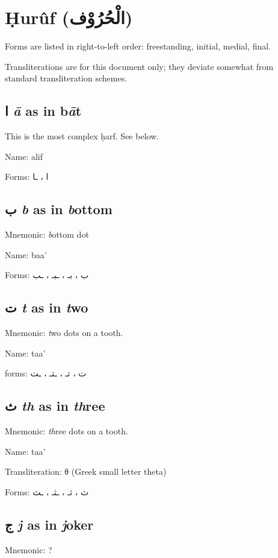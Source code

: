 \documentclass[11pt]{article}
\begin{document}
\section{Ḥurûf (\textarabic{الْحُرُوْف})}

Forms are listed in right-to-left order: freestanding, initial,
medial, final.

Transliterations are for this document only; they deviate somewhat
from standard transliteration schemes.

\subsection{ \textarabic{ا}  \textit{ā} as in b\textit{ā}t}
This is the most complex ḥarf. See below.

\noindent Name: alif

\noindent Forms: \textarabic{ا ، ـا}


\subsection{ \textarabic{ب}  \textit{b} as in \textit{b}ottom}
Mnemonic: \textit{b}ottom dot

\noindent Name: baa'

\noindent Forms: \textarabic{ب ، بـ ، ـبـ ، ـب}


\subsection{ \textarabic{ت} \textit{t} as in \textit{t}wo}
Mnemonic: \textit{t}wo dots on a tooth.

\noindent Name: taa'

\noindent forms: \textarabic{ت ، تـ ، ـتـ ، ـت}

\subsection{ \textarabic{ث} \textit{th} as in \textit{th}ree}
Mnemonic:  \textit{th}ree dots on a tooth.

\noindent Name: taa'

\noindent Transliteration: θ (Greek small letter theta)

\noindent Forms: \textarabic{ث ، ثـ ، ـثـ ، ـث}

\subsection{ \textarabic{ج} \textit{j} as in \textit{j}oker}
Mnemonic:  ?
\end{document}
